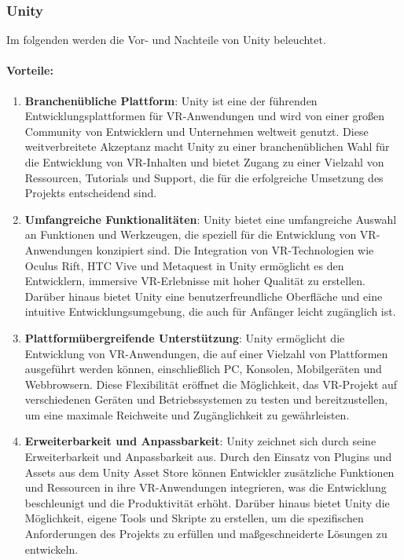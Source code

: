 \subsubsection{Unity}
Im folgenden werden die Vor- und Nachteile von Unity beleuchtet.
\paragraph{Vorteile:}

\begin{enumerate}
\item \textbf{Branchenübliche Plattform}: Unity ist eine der führenden Entwicklungsplattformen für VR-Anwendungen und wird von einer großen Community von Entwicklern und Unternehmen weltweit genutzt. Diese weitverbreitete Akzeptanz macht Unity zu einer branchenüblichen Wahl für die Entwicklung von VR-Inhalten und bietet Zugang zu einer Vielzahl von Ressourcen, Tutorials und Support, die für die erfolgreiche Umsetzung des Projekts entscheidend sind.
\item \textbf{Umfangreiche Funktionalitäten}: Unity bietet eine umfangreiche Auswahl an Funktionen und Werkzeugen, die speziell für die Entwicklung von VR-Anwendungen konzipiert sind. Die Integration von VR-Technologien wie Oculus Rift, HTC Vive und Metaquest in Unity ermöglicht es den Entwicklern, immersive VR-Erlebnisse mit hoher Qualität zu erstellen. Darüber hinaus bietet Unity eine benutzerfreundliche Oberfläche und eine intuitive Entwicklungsumgebung, die auch für Anfänger leicht zugänglich ist.

\item \textbf{Plattformübergreifende Unterstützung}: Unity ermöglicht die Entwicklung von VR-Anwendungen, die auf einer Vielzahl von Plattformen ausgeführt werden können, einschließlich PC, Konsolen, Mobilgeräten und Webbrowsern. Diese Flexibilität eröffnet die Möglichkeit, das VR-Projekt auf verschiedenen Geräten und Betriebssystemen zu testen und bereitzustellen, um eine maximale Reichweite und Zugänglichkeit zu gewährleisten.

\item \textbf{Erweiterbarkeit und Anpassbarkeit}: Unity zeichnet sich durch seine Erweiterbarkeit und Anpassbarkeit aus. Durch den Einsatz von Plugins und Assets aus dem Unity Asset Store können Entwickler zusätzliche Funktionen und Ressourcen in ihre VR-Anwendungen integrieren, was die Entwicklung beschleunigt und die Produktivität erhöht. Darüber hinaus bietet Unity die Möglichkeit, eigene Tools und Skripte zu erstellen, um die spezifischen Anforderungen des Projekts zu erfüllen und maßgeschneiderte Lösungen zu entwickeln.
\end{enumerate}

